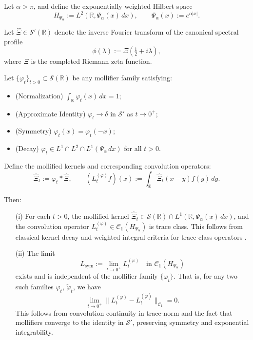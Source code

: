 \begin{lemma}
\label{lem:mollifier_independence_kernel_limit}
Let \( \alpha > \pi \), and define the exponentially weighted Hilbert space
\[
H_{\Psi_\alpha} := L^2(\mathbb{R}, \Psi_\alpha(x)\, dx), \qquad \Psi_\alpha(x) := e^{\alpha |x|}.
\]

Let \( \widehat{\Xi} \in \mathcal{S}'(\mathbb{R}) \) denote the inverse Fourier transform of the canonical spectral profile
\[
\phi(\lambda) := \Xi\left( \tfrac{1}{2} + i\lambda \right),
\]
where \( \Xi \) is the completed Riemann zeta function.

Let \( \{\varphi_t\}_{t > 0} \subset \mathcal{S}(\mathbb{R}) \) be any mollifier family satisfying:
\begin{itemize}
    \item \textnormal{(Normalization)} \( \int_{\mathbb{R}} \varphi_t(x)\, dx = 1 \);
    \item \textnormal{(Approximate Identity)} \( \varphi_t \to \delta \) in \( \mathcal{S}' \) as \( t \to 0^+ \);
    \item \textnormal{(Symmetry)} \( \varphi_t(x) = \varphi_t(-x) \);
    \item \textnormal{(Decay)} \( \varphi_t \in L^1 \cap L^2 \cap L^1(\Psi_\alpha\, dx) \) for all \( t > 0 \).
\end{itemize}

Define the mollified kernels and corresponding convolution operators:
\[
\widehat{\Xi}_t := \varphi_t * \widehat{\Xi}, \qquad
(L_t^{(\varphi)} f)(x) := \int_{\mathbb{R}} \widehat{\Xi}_t(x - y) f(y)\, dy.
\]

Then:
\begin{enumerate}
    \item[\textnormal{(i)}] For each \( t > 0 \), the mollified kernel \( \widehat{\Xi}_t \in \mathcal{S}(\mathbb{R}) \cap L^1(\mathbb{R}, \Psi_\alpha(x)\, dx) \), and the convolution operator \( L_t^{(\varphi)} \in \mathcal{C}_1(H_{\Psi_\alpha}) \) is trace class. This follows from classical kernel decay and weighted integral criteria for trace-class operators \cite[Ch.~4]{Simon2005TraceIdeals}.

    \item[\textnormal{(ii)}] The limit
    \[
    L_{\mathrm{sym}} := \lim_{t \to 0^+} L_t^{(\varphi)} \quad \text{in } \mathcal{C}_1(H_{\Psi_\alpha})
    \]
    exists and is independent of the mollifier family \( \{\varphi_t\} \). That is, for any two such families \( \varphi_t \), \( \tilde{\varphi}_t \), we have
    \[
    \lim_{t \to 0^+} \| L_t^{(\varphi)} - L_t^{(\tilde{\varphi})} \|_{\mathcal{C}_1} = 0.
    \]
    This follows from convolution continuity in trace-norm and the fact that mollifiers converge to the identity in \( \mathcal{S}' \), preserving symmetry and exponential integrability.
\end{enumerate}


\end{lemma}
